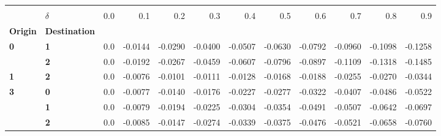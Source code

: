 \begin{tabular}{llrrrrrrrrrr}
\toprule
  & {} \\
  & \textbf{\(\delta\)} &  0.0 &     0.1 &     0.2 &     0.3 &     0.4 &     0.5 &     0.6 &     0.7 &     0.8 &     0.9 \\
\textbf{Origin} & \textbf{Destination} &      &         &         &         &         &         &         &         &         &         \\
\midrule
\textbf{0} & \textbf{1} &  0.0 & -0.0144 & -0.0290 & -0.0400 & -0.0507 & -0.0630 & -0.0792 & -0.0960 & -0.1098 & -0.1258 \\
  & \textbf{2} &  0.0 & -0.0192 & -0.0267 & -0.0459 & -0.0607 & -0.0796 & -0.0897 & -0.1109 & -0.1318 & -0.1485 \\
\textbf{1} & \textbf{2} &  0.0 & -0.0076 & -0.0101 & -0.0111 & -0.0128 & -0.0168 & -0.0188 & -0.0255 & -0.0270 & -0.0344 \\
\textbf{3} & \textbf{0} &  0.0 & -0.0077 & -0.0140 & -0.0176 & -0.0227 & -0.0277 & -0.0322 & -0.0407 & -0.0486 & -0.0522 \\
  & \textbf{1} &  0.0 & -0.0079 & -0.0194 & -0.0225 & -0.0304 & -0.0354 & -0.0491 & -0.0507 & -0.0642 & -0.0697 \\
  & \textbf{2} &  0.0 & -0.0085 & -0.0147 & -0.0274 & -0.0339 & -0.0375 & -0.0476 & -0.0521 & -0.0658 & -0.0760 \\
\bottomrule
\end{tabular}
